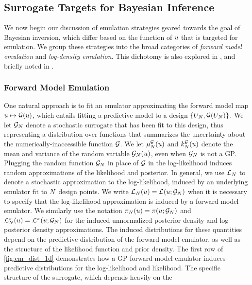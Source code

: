 \documentclass[12pt]{article}
\begin{document}
\subsection{Surrogate Targets for Bayesian Inference}
We now begin our discussion of emulation strategies geared towards the goal of Bayesian inversion,
which differ based on the function of $\Par$ that is targeted for emulation.
We group these strategies into the broad categories of \textit{forward model emulation}
and \textit{log-density emulation}. This dichotomy is also explored in 
\citet{StuartTeck1,GP_PDE_priors,random_fwd_models}, and briefly noted in 
\citet{Surer2023sequential,trainDynamics,ActiveLearningMCMC,emPostDens}.

\subsubsection{Forward Model Emulation}
One natural approach is to fit an emulator approximating the forward model map $\Par \mapsto \fwd(\Par)$,
which entails fitting a predictive model to a design $\{\designIn, \fwd(\designIn)\}$. 
We let $\fwdEm[\Ndesign]$ denote a stochastic surrogate that has been fit to this design,
thus representing a distribution over functions that summarizes the uncertainty about the 
numerically-inaccessible function $\fwd$. We let $\emMean[\Ndesign]{\fwd}(\Par)$ and 
$\emKer[\Ndesign]{\fwd}(\Par)$ denote the mean and variance of the random 
variable $\fwdEm[\Ndesign](\Par)$, even when $\fwdEm[\Ndesign]$ is not a GP.
Plugging the random function $\fwdEm[\Ndesign]$ in place of $\fwd$ in the log-likelihood 
induces random approximations of the likelihood and posterior. In general, we use 
$\llikEm[\Ndesign]$ to denote a stochastic approximation to the log-likelihood, induced
by an underlying emulator fit to $\Ndesign$ design points. We write 
$\llikEm[\Ndesign](\Par) = \llik(\Par; \fwdEm[\Ndesign])$ when it is necessary to specify that
the log-likelihood approximation is induced by a forward model emulator. We similarly use 
the notation $\postEm(\Par) = \postDens(\Par; \fwdEm[\Ndesign])$ and 
$\lpostEm(\Par) = \lpost(\Par; \fwdEm[\Ndesign])$ for the induced unnormalized 
posterior density and log posterior density approximations. The induced distributions for 
these quantities depend on the predictive distribution of the forward model emulator, as
well as the structure of the likelihood function and prior density. The first row of \cref{fig:em_dist_1d} 
demonstrates how a GP forward model emulator induces predictive distributions 
for the log-likelihood and likelihood. The specific structure of the surrogate, which depends heavily on the 
\end{document}
